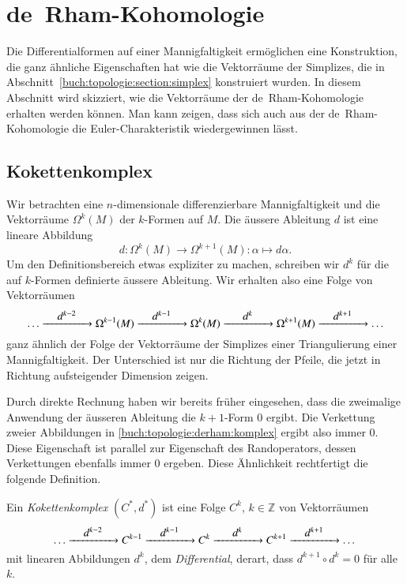 %
%
\section{de~Rham-Kohomologie
\label{buch:topologie:section:drham}}
Die Differentialformen auf einer Mannigfaltigkeit ermöglichen eine
Konstruktion, die ganz ähnliche Eigenschaften hat wie die Vektorräume
der Simplizes, die in Abschnitt~\ref{buch:topologie:section:simplex}
konstruiert wurden.
In diesem Abschnitt wird skizziert, wie die Vektorräume der
de~Rham-Kohomologie erhalten werden können.
Man kann zeigen, dass sich auch aus der de~Rham-Kohomologie die
Euler-Charakteristik wiedergewinnen lässt.

%
%
\subsection{Kokettenkomplex}
Wir betrachten eine $n$-dimensionale differenzierbare Mannigfaltigkeit
und die Vektorräume $\Omega^k(M)$ der $k$-Formen auf $M$.
Die äussere Ableitung $d$ ist eine lineare Abbildung
\[
d
\colon
\Omega^k(M) \to \Omega^{k+1}(M)
:
\alpha \mapsto d\alpha.
\]
Um den Definitionsbereich etwas expliziter zu machen, schreiben wir
$d^k$ für die auf $k$-Formen definierte äussere Ableitung.
Wir erhalten also eine Folge von Vektorräumen 
\begin{equation}
\dots
\xrightarrow{\qquad\clap{$d^{k-2}$}\qquad}
\Omega^{k-1}(M)
\xrightarrow{\qquad\clap{$d^{k-1}$}\qquad}
\Omega^k(M)
\xrightarrow{\qquad\clap{$d^{k}$}\qquad}
\Omega^{k+1}(M)
\xrightarrow{\qquad\clap{$d^{k+1}$}\qquad}
\dots
\label{buch:topologie:derham:komplex}
\end{equation}
ganz ähnlich der Folge der Vektorräume der Simplizes einer
Triangulierung einer Mannigfaltigkeit.
Der Unterschied ist nur die Richtung der Pfeile, die jetzt in
Richtung aufsteigender Dimension zeigen.

Durch direkte Rechnung haben wir bereits früher eingesehen, dass die
zweimalige Anwendung der äusseren Ableitung die $k+1$-Form 0 ergibt.
Die Verkettung zweier Abbildungen in \eqref{buch:topologie:derham:komplex}
ergibt also immer $0$.
Diese Eigenschaft ist parallel zur Eigenschaft des Randoperators,
dessen Verkettungen ebenfalls immer $0$ ergeben.
Diese Ähnlichkeit rechtfertigt die folgende Definition.

\begin{definition}[Kokettenkomplex]
%
Ein \emph{Kokettenkomplex} $(C^*,d^*)$ ist eine Folge $C^k$, $k\in\mathbb{Z}$
von Vektorräumen 
\[
\dots
\xrightarrow{\qquad\clap{$d^{k-2}$}\qquad}
C^{k-1}
\xrightarrow{\qquad\clap{$d^{k-1}$}\qquad}
C^k
\xrightarrow{\qquad\clap{$d^{k}$}\qquad}
C^{k+1}
\xrightarrow{\qquad\clap{$d^{k+1}$}\qquad}
\dots
\]
mit linearen Abbildungen $d^k$, dem \emph{Differential},
%
derart, dass $d^{k+1}\circ d^k=0$ für alle $k$.
\end{definition}

